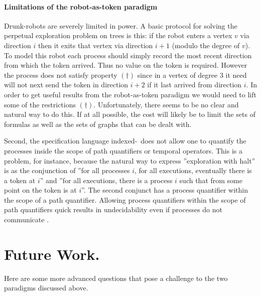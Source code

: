 \paragraph{Limitations of the robot-as-token paradigm}

Drunk-robots are severely limited in power. A basic protocol for solving the
perpetual exploration problem on trees is this: if the robot enters a vertex $v$
via direction $i$ then it exits that vertex via direction $i+1$ (modulo the
degree of $v$). To model this robot each process should simply record the most
recent direction from which the token arrived. Thus no value on the token is
required. However the process does not satisfy property $(\dagger)$ since in a
vertex of degree $3$ it need will not next send the token in direction $i+2$ if
it last arrived from direction $i$. In order to get useful results from the
robot-as-token paradigm we would need to lift some of the restrictions
$(\dagger)$. Unfortunately, there seems to be no clear and natural way to do
this. If at all possible, the cost will likely be to limit the sets of formulas
as well as the sets of graphs that can be dealt with.

Second, the specification language indexed-\CTLstar\ does not allow one to
quantify the processes inside the scope of path quantifiers or temporal
operators. This is a problem, for instance, because the natural way to express
''exploration with halt'' is as the conjunction of ''for all processes $i$, for
all executions, eventually there is a token at $i$'' and ''for all executions,
there is a process $i$ such that from some point on the token is at $i$''. The
second conjunct has a process quantifier within the scope of a path quantifier.
Allowing process quantifiers within the scope of path quantifiers quick results
in undecidability even if processes do not communicate \cite{Igor12}.



\section{Future Work.}

Here are some more advanced questions that pose a challenge to the two paradigms
discussed above.


